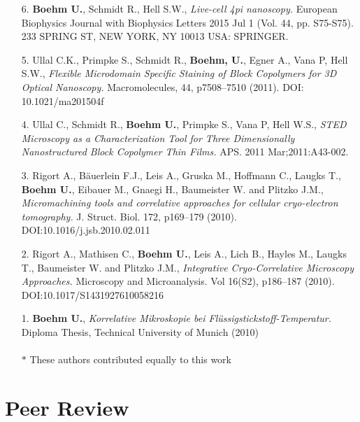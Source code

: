 \documentclass[margin,line]{res}
\begin{document}
\begin{resume}
\begin{enumerate}[leftmargin=*]
\item[6.] {\bf Boehm U.}, Schmidt R., Hell S.W., {\it Live-cell 4pi nanoscopy.} European Biophysics Journal with Biophysics Letters 2015 Jul 1 (Vol. 44, pp. S75-S75). 233 SPRING ST, NEW YORK, NY 10013 USA: SPRINGER.

\item[5.] Ullal C.K., Primpke S., Schmidt R., {\bf Boehm, U.}, Egner A., Vana P, Hell S.W., {\it Flexible Microdomain Specific Staining of Block Copolymers for 3D Optical Nanoscopy.} Macromolecules, 44, p7508–7510 (2011). DOI: 10.1021/ma201504f

\item[4.] Ullal C., Schmidt R., {\bf  Boehm U.}, Primpke S., Vana P, Hell W.S.,  {\it STED Microscopy as a Characterization Tool for Three Dimensionally Nanostructured Block Copolymer Thin Films.} APS. 2011 Mar;2011:A43-002.

\item[3.] Rigort A., Bäuerlein F.J., Leis A., Gruska M., Hoffmann C., Laugks T., {\bf Boehm U.}, Eibauer M., Gnaegi H., Baumeister W. and Plitzko J.M.,  {\it Micromachining tools and correlative approaches for cellular cryo-electron tomography.} J. Struct. Biol. 172, p169–179 (2010). \\DOI:10.1016/j.jsb.2010.02.011

\item[2.] Rigort A., Mathisen C., {\bf Boehm U.}, Leis A., Lich B., Hayles M., Laugks T., Baumeister W. and Plitzko J.M.,  {\it Integrative Cryo-Correlative Microscopy Approaches.}
Microscopy and Microanalysis. Vol 16(S2), p186–187 (2010). DOI:10.1017/S1431927610058216 

\item[1.]{\bf Boehm U.},  {\it Korrelative Mikroskopie bei Flüssigstickstoff-Temperatur.} Diploma Thesis, Technical University of Munich (2010)  \\ \\
$*$ These authors contributed equally to this work

\end{enumerate}


\section{\sc Peer Review} 


\end{resume}
\end{document}
